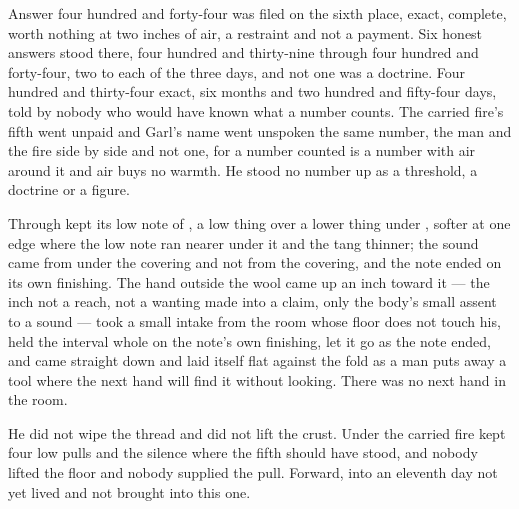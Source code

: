 Answer four hundred and forty-four was filed on the sixth place, exact, complete, worth nothing at two inches of air, a restraint and not a payment. Six honest answers stood there, four hundred and thirty-nine through four hundred and forty-four, two to each of the three days, and not one was a doctrine. Four hundred and thirty-four exact, six months and two hundred and fifty-four days, told by nobody who would have known what a number counts. The carried fire's fifth went unpaid and Garl's name went unspoken the same number, the man and the fire side by side and not one, for a number counted is a number with air around it and air buys no warmth. He stood no number up as a threshold, a doctrine or a figure.

Through   kept its low note of , a low thing over a lower thing under , softer at one edge where the low note ran nearer under it and the tang thinner; the sound came from under the covering and not from the covering, and the note ended on its own finishing. The hand outside the wool came up an inch toward it --- the inch not a reach, not a wanting made into a claim, only the body's small assent to a sound --- took a small intake from the room whose floor does not touch his, held the interval whole on the note's own finishing, let it go as the note ended, and came straight down and laid itself flat against the fold as a man puts away a tool where the next hand will find it without looking. There was no next hand in the room.

He did not wipe the thread and did not lift the crust. Under  the carried fire kept four low pulls and the silence where the fifth should have stood, and nobody lifted the floor and nobody supplied the pull. Forward, into an eleventh day not yet lived and not brought into this one.
